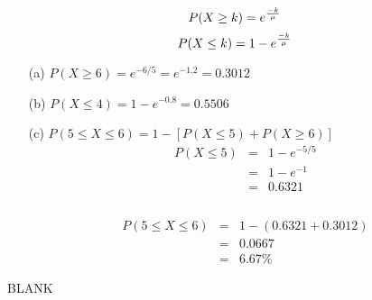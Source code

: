 \documentclass[a4paper,12pt]{article}
\begin{document}
\begin{framed}
\[
P( X \geq k) = e^{{-k \over \mu}}
\]
\[
P( X \leq k) = 1 - e^{{-k \over \mu}}
\]
\end{framed}
\large 
\begin{itemize}
\item[(a)] $P(X \geq 6) = e^{-6/5} =  e^{-1.2} = 0.3012$
\item[(b)] $P(X \leq 4) =  1 - e^{-0.8} = 0.5506$
\item[(c)] $P(5 \leq X \leq 6) = 1- [ P( X \leq 5) +  P( X \geq 6)]$ \\ \smallskip
\begin{eqnarray*} 
P( X \leq 5)  &=& 1 - e^{-5/5} \\
&=& 1 - e^{-1} \\
&=& 0.6321 \\
\end{eqnarray*}
\\ \smallskip
\begin{eqnarray*} 
P(5 \leq X \leq 6) &=& 1 - (0.6321 + 0.3012) \\ 
&=& 0.0667\\
&=& 6.67 \%
\end{eqnarray*}
\end{itemize}	

\newpage
BLANK
\end{document}
